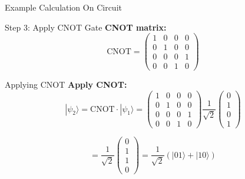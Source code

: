 \documentclass{beamer}
\begin{document}
\begin{frame}{Example Calculation On Circuit}
    \begin{block}{Step 3: Apply CNOT Gate}
        \textbf{CNOT matrix:}
        \[
        \text{CNOT} = \begin{pmatrix} 
        1 & 0 & 0 & 0 \\ 
        0 & 1 & 0 & 0 \\ 
        0 & 0 & 0 & 1 \\ 
        0 & 0 & 1 & 0 
        \end{pmatrix}
        \]
    \end{block}
    \begin{block}{Applying CNOT}
        \textbf{Apply CNOT:}
        \[
        |\psi_2\rangle = \text{CNOT} \cdot |\psi_1\rangle = \begin{pmatrix} 
        1 & 0 & 0 & 0 \\ 
        0 & 1 & 0 & 0 \\ 
        0 & 0 & 0 & 1 \\ 
        0 & 0 & 1 & 0 
        \end{pmatrix} \frac{1}{\sqrt{2}} \begin{pmatrix} 0 \\ 1 \\ 0 \\ 1 \end{pmatrix}
        \]
        
        \[
        = \frac{1}{\sqrt{2}} \begin{pmatrix} 0 \\ 1 \\ 1 \\ 0 \end{pmatrix} = \frac{1}{\sqrt{2}}(|01\rangle + |10\rangle)
        \]
    \end{block}
    
    \framebreak
    

\end{frame}
\end{document}
